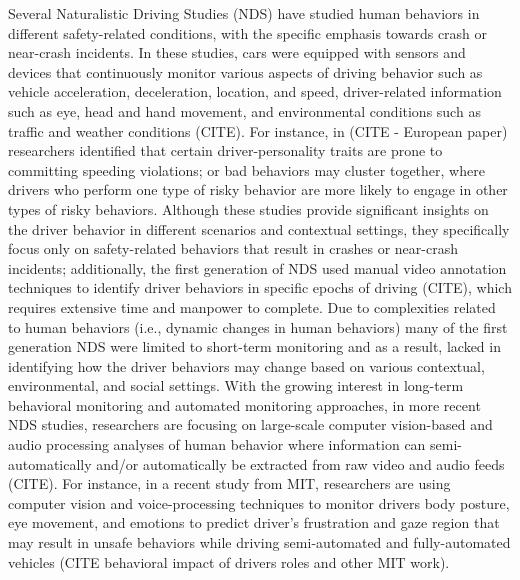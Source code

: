 Several Naturalistic Driving Studies (NDS) have studied human behaviors in different safety-related conditions, with the specific emphasis towards crash or near-crash incidents. In these studies, cars were equipped with sensors and devices that continuously monitor various aspects of driving behavior such as vehicle acceleration, deceleration, location, and speed, driver-related information such as eye, head and hand movement, and environmental conditions such as traffic and weather conditions (CITE). For instance, in (CITE - European paper) researchers identified that certain driver-personality traits are prone to committing speeding violations; or bad behaviors may cluster together, where drivers who perform one type of risky behavior are more likely to engage in other types of risky behaviors. Although these studies provide significant insights on the driver behavior in different scenarios and contextual settings, they specifically focus only on safety-related behaviors that result in crashes or near-crash incidents; additionally, the first generation of NDS used manual video annotation techniques to identify driver behaviors in specific epochs of driving (CITE), which requires extensive time and manpower to complete. Due to complexities related to human behaviors (i.e., dynamic changes in human behaviors) many of the first generation NDS were limited to short-term monitoring and as a result, lacked in identifying how the driver behaviors may change based on various contextual, environmental, and social settings. With the growing interest in long-term behavioral monitoring and automated monitoring approaches, in more recent NDS studies, researchers are focusing on large-scale computer vision-based and audio processing analyses of human behavior where information can  semi-automatically and/or automatically be extracted from raw video and audio feeds (CITE). For instance, in a recent study from MIT, researchers are using computer vision and voice-processing techniques to monitor drivers body posture, eye movement, and emotions to predict driver's frustration and gaze region that may result in unsafe behaviors while driving semi-automated and fully-automated vehicles (CITE behavioral impact of drivers roles and other MIT work). 
  
